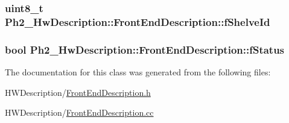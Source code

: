 \hypertarget{class_ph2___hw_description_1_1_front_end_description_a7ce5e0acdcb5647bb94f09ec480e8155}{
\subsubsection[{f\-Shelve\-Id}]{\setlength{\rightskip}{0pt plus 5cm}uint8\-\_\-t Ph2\-\_\-\-Hw\-Description\-::\-Front\-End\-Description\-::f\-Shelve\-Id}}\label{class_ph2___hw_description_1_1_front_end_description_a7ce5e0acdcb5647bb94f09ec480e8155}
\hypertarget{class_ph2___hw_description_1_1_front_end_description_a719dce1ef5c6656fd71ae91f6f404053}{
\subsubsection[{f\-Status}]{\setlength{\rightskip}{0pt plus 5cm}bool Ph2\-\_\-\-Hw\-Description\-::\-Front\-End\-Description\-::f\-Status}}\label{class_ph2___hw_description_1_1_front_end_description_a719dce1ef5c6656fd71ae91f6f404053}


The documentation for this class was generated from the following files\-:\begin{DoxyCompactItemize}
\item 
H\-W\-Description/\hyperlink{_front_end_description_8h}{Front\-End\-Description.\-h}\item 
H\-W\-Description/\hyperlink{_front_end_description_8cc}{Front\-End\-Description.\-cc}\end{DoxyCompactItemize}
